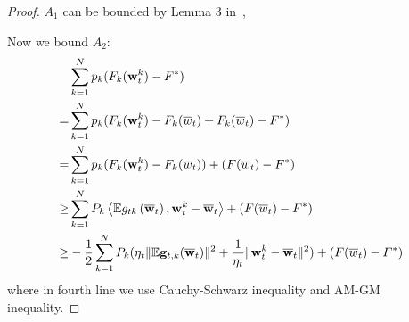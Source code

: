 \begin{proof}
$A_1$ can be bounded by Lemma 3 in~\cite{li2019convergence}, 


Now we bound $A_2$:
\begin{align}
	& \sum_{k=1}^N p_k (F_k({\mathbf{w}}_t^k) - F^*) \\
 = & \sum_{k=1}^N p_k (F_k({\mathbf{w}}_t^k) - F_k(\overline{w}_t) + F_k(\overline{w}_t) - F^*) \\
 = & \sum_{k=1}^N p_k (F_k({\mathbf{w}}_t^k) - F_k(\overline{w}_t) ) + (F(\overline{w}_t) - F^*)\\ 
 \geq & \sum_{k=1}^{N} P_{k}\left<\mathbb{E} g_{t k}\left(\overline{{\mathbf{w}}}_{t}\right), {\mathbf{w}}_{t}^k-\overline{{\mathbf{w}}}_{t}\right> + (F(\overline{w}_t) - F^*)\\
 \geq& -\frac{1}{2} \sum_{k=1}^{N} P_{k} (\eta_t \|\mathbb{E} {\mathbf{g}}_{t,k}(\overline{{\mathbf{w}}}_t) \|^2 + \frac{1}{\eta_t} \|{\mathbf{w}}_t^k - \overline{{\mathbf{w}}}_t\|^2) + (F(\overline{w}_t) - F^*) \label{eq:a24}
\end{align}
where in fourth line we use Cauchy-Schwarz inequality and AM-GM inequality. 



\end{proof}
